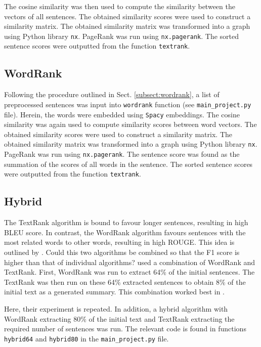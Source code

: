 \documentclass[11pt]{article}
\begin{document}
The cosine similarity was then used to compute the similarity between the vectors of all sentences. The obtained similarity scores were used to construct a similarity matrix. The obtained similarity matrix was transformed into a graph using Python library \texttt{nx}. PageRank was run using \texttt{nx.pagerank}. The sorted sentence scores were outputted from the function \texttt{textrank}.

\subsection{WordRank}

Following the procedure outlined in Sect. \ref{subsect:wordrank}, a list of preprocessed sentences was input into \texttt{wordrank} function (see \texttt{main\_project.py} file). Herein, the words were embedded using \texttt{Spacy} embeddings. The cosine similarity was again used to compute similarity scores between word vectors. The obtained similarity scores were used to construct a similarity matrix. The obtained similarity matrix was transformed into a graph using Python library \texttt{nx}. PageRank was run using \texttt{nx.pagerank}. The sentence score was found as the summation of the scores of all words in the sentence. The sorted sentence scores were outputted from the function \texttt{textrank}.

\subsection{Hybrid}

The TextRank algorithm is bound to favour longer sentences, resulting in high BLEU score. In contrast, the WordRank algorithm favours sentences with the most related words to other words, resulting in high ROUGE. This idea is outlined by \citet{reza2020}. Could this two algorithms be combined so that the F1 score is higher than that of individual algorithms? \citet{reza2020} used a combination of WordRank and TextRank. First, WordRank was run to extract 64\% of the initial sentences. The TextRank was then run on these 64\% extracted sentences to obtain 8\% of the initial text as a generated summary. This combination worked best in \citet{reza2020}. 

Here, their experiment is repeated. In addition, a hybrid algorithm with WordRank extracting 80\% of the initial text and TextRank extracting the required number of sentences was run. The relevant code is found in functions \texttt{hybrid64} and \texttt{hybrid80} in the \texttt{main\_project.py} file.
\end{document}
